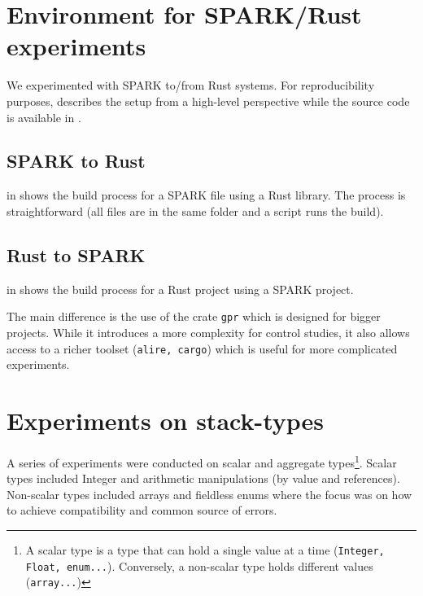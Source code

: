 \documentclass[nomenclature, english, bibtex]{kththesis}
\begin{document}
\section[Environment for \& SPARK/Rust experiments]{Environment for SPARK/Rust experiments}

We experimented with SPARK to/from Rust systems. For reproducibility purposes,   describes the setup from a high-level perspective while the source code is available in .

\subsection{SPARK to Rust}

 in 
shows the build process for a SPARK file using a Rust library. The process is straightforward (all files are in the same folder and a script runs the build).
\subsection{Rust to SPARK}

 in  shows the build process for a Rust project using a SPARK project. 

The main difference is the use of the crate \texttt{gpr} which is designed for bigger projects. While it introduces a more complexity for control studies, it also allows access to a richer toolset (\texttt{alire, cargo}) which is useful for more complicated experiments.  

\section{Experiments on stack-types}

A series of experiments were conducted on scalar and aggregate types\footnote{A scalar type is a type that can hold a single value at a time (\texttt{Integer, Float, enum...}). Conversely, a non-scalar type holds different values (\texttt{array...})}. Scalar types included Integer and arithmetic manipulations (by value and references). Non-scalar types included arrays and fieldless enums where the focus was on how to achieve compatibility and common source of errors.
\end{document}
